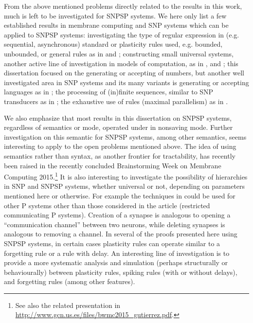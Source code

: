 From the above mentioned problems directly related to the results in this work, much is left to be investigated for SNPSP systems.
We here only list a few  established results in membrane computing and SNP systems which can be applied to SNPSP systems: 
investigating the type of regular expression in (e.g. sequential, asynchronous) standard or plasticity rules used, e.g. bounded, unbounded, or general rules as in \cite{asyn-snp} and \cite{asyn-loc};
constructing small universal systems, another active line of investigation in models of computation, as in \cite{snp-small-univer}, \cite{paun-paun} and \cite{simple-snp-weights};
this dissertation focused on the generating or accepting of numbers, but another well investigated area in SNP systems and its many variants is generating or accepting languages as in \cite{chen2008}\cite{snp-omega}\cite{hand-snp};
the processing of (in)finite sequences, similar to SNP transducers as in \cite{spike-train};
the exhaustive use of rules (maximal parallelism) as in \cite{pan-zeng-small-exhaust}. 

We also emphasize that most results in this dissertation on SNPSP systems, regardless of semantics or mode, operated under in nonsaving mode.
Further investigation on this semantic for SNPSP systems, among other semantics, seems interesting to apply to the open problems mentioned above.
The idea of using semantics rather than syntax, as another frontier for tractability, has recently been raised in the recently concluded Brainstorming Week on Membrane Computing 2015.\footnote{See also the related presentation in \url{http://www.gcn.us.es/files/bwmc2015_gutierrez.pdf}.}
It is also interesting to investigate the possibility of hierarchies in SNP and SNPSP systems, whether universal or not, depending on parameters mentioned here or otherwise.
For example the techniques in \cite{ibarra-hierarchy} could be used for other P systems other than those considered in the article (restricted communicating P systems).
Creation of a synapse is analogous to opening a ``communication channel'' between two neurons, while deleting synapses is analogous to removing a channel.
In several of the proofs presented here using SNPSP systems, in certain cases plasticity rules can operate similar to a forgetting rule or a rule with delay.
An interesting line of investigation is to provide a more systematic analysis and simulation (perhaps structurally or behaviourally) between plasticity rules, spiking rules (with or without delays), and forgetting rules (among other features).

